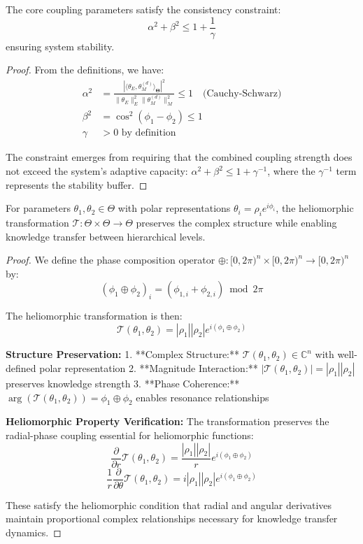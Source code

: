 \begin{lemma}
\label{lem:coupling_relationships}
The core coupling parameters satisfy the consistency constraint:
$$\alpha^2 + \beta^2 \leq 1 + \frac{1}{\gamma}$$
ensuring system stability.
\end{lemma}

\begin{proof}
From the definitions, we have:
\begin{align}
\alpha^2 &= \frac{|\langle \theta_E, \theta_M^{(d)} \rangle_{\boldsymbol{\Theta}}|^2}{\|\theta_E\|_E^2 \|\theta_M^{(d)}\|_M^2} \leq 1 \quad \text{(Cauchy-Schwarz)} \\
\beta^2 &= \cos^2(\phi_1 - \phi_2) \leq 1 \\
\gamma &> 0 \text{ by definition}
\end{align}

The constraint emerges from requiring that the combined coupling strength does not exceed the system's adaptive capacity: $\alpha^2 + \beta^2 \leq 1 + \gamma^{-1}$, where the $\gamma^{-1}$ term represents the stability buffer.
\end{proof}

\begin{theorem}
\label{thm:heliomorphic_transformation}
For parameters $\theta_1, \theta_2 \in \Theta$ with polar representations $\theta_i = \rho_i e^{i\phi_i}$, the heliomorphic transformation $\mathcal{T}: \Theta \times \Theta \rightarrow \Theta$ preserves the complex structure while enabling knowledge transfer between hierarchical levels.
\end{theorem}

\begin{proof}
We define the phase composition operator $\oplus: [0,2\pi)^n \times [0,2\pi)^n \rightarrow [0,2\pi)^n$ by:
$$(\phi_1 \oplus \phi_2)_i = (\phi_{1,i} + \phi_{2,i}) \bmod 2\pi$$

The heliomorphic transformation is then:
$$\mathcal{T}(\theta_1, \theta_2) = |\rho_1||\rho_2|e^{i(\phi_1 \oplus \phi_2)}$$

\textbf{Structure Preservation:} 
1. **Complex Structure:** $\mathcal{T}(\theta_1, \theta_2) \in \mathbb{C}^n$ with well-defined polar representation
2. **Magnitude Interaction:** $|\mathcal{T}(\theta_1, \theta_2)| = |\rho_1||\rho_2|$ preserves knowledge strength
3. **Phase Coherence:** $\arg(\mathcal{T}(\theta_1, \theta_2)) = \phi_1 \oplus \phi_2$ enables resonance relationships

\textbf{Heliomorphic Property Verification:}
The transformation preserves the radial-phase coupling essential for heliomorphic functions:
$$\frac{\partial}{\partial r} \mathcal{T}(\theta_1, \theta_2) = \frac{|\rho_1||\rho_2|}{r} e^{i(\phi_1 \oplus \phi_2)}$$
$$\frac{1}{r}\frac{\partial}{\partial \theta} \mathcal{T}(\theta_1, \theta_2) = i|\rho_1||\rho_2| e^{i(\phi_1 \oplus \phi_2)}$$

These satisfy the heliomorphic condition that radial and angular derivatives maintain proportional complex relationships necessary for knowledge transfer dynamics.
\end{proof}

